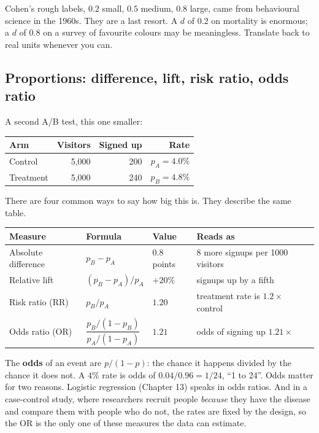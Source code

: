 Cohen's rough labels, $0.2$ small, $0.5$ medium, $0.8$ large, came from
behavioural science in the 1960s. They are a last resort. A $d$ of $0.2$ on
mortality is enormous; a $d$ of $0.8$ on a survey of favourite colours may be
meaningless. Translate back to real units whenever you can.

\subsection{Proportions: difference, lift, risk ratio, odds ratio}

A second A/B test, this one smaller:

\begin{center}
\begin{tabular}{lrrr}
\toprule
Arm & Visitors & Signed up & Rate \\
\midrule
Control & 5{,}000 & 200 & $p_A=4.0\%$ \\
Treatment & 5{,}000 & 240 & $p_B=4.8\%$ \\
\bottomrule
\end{tabular}
\end{center}

There are four common ways to say how big this is. They describe the same table.

\begin{center}
\renewcommand{\arraystretch}{1.3}
\begin{tabular}{llll}
\toprule
Measure & Formula & Value & Reads as \\
\midrule
Absolute difference & $p_B-p_A$ & $0.8$ points & 8 more signups per 1000 visitors \\
Relative lift & $(p_B-p_A)/p_A$ & $+20\%$ & signups up by a fifth \\
Risk ratio (RR) & $p_B/p_A$ & $1.20$ & treatment rate is $1.2\times$ control \\
Odds ratio (OR) & $\dfrac{p_B/(1-p_B)}{p_A/(1-p_A)}$ & $1.21$ & odds of signing up $1.21\times$ \\
\bottomrule
\end{tabular}
\end{center}

The \textbf{odds} of an event are $p/(1-p)$: the chance it happens divided by the
chance it does not. A $4\%$ rate is odds of $0.04/0.96=1/24$, ``1 to 24''. Odds
matter for two reasons. Logistic regression (Chapter 13) speaks in odds ratios. And
in a case-control study, where researchers recruit people \emph{because} they have
the disease and compare them with people who do not, the rates are fixed by the
design, so the OR is the only one of these measures the data can estimate.

